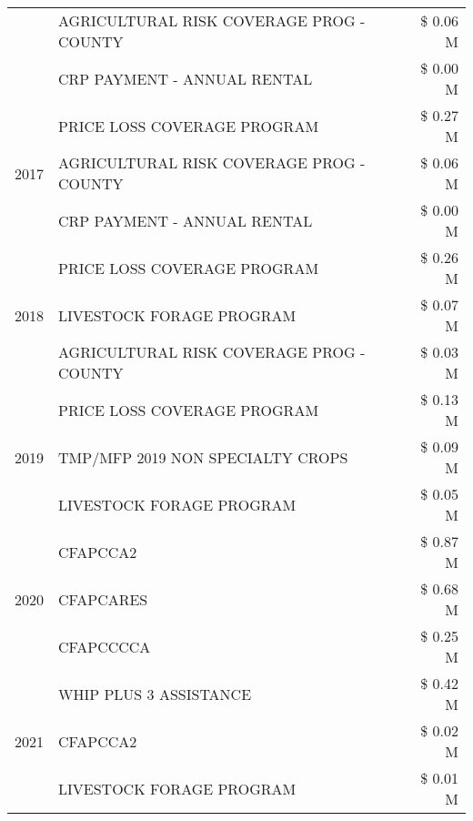 \begin{tabular}{llr}
 & AGRICULTURAL RISK COVERAGE PROG - COUNTY      & \$ 0.06 M \\
 & CRP PAYMENT - ANNUAL RENTAL                   & \$ 0.00 M \\
\cline{1-3}
\multirow[t]{3}{*}{2017} & PRICE LOSS COVERAGE PROGRAM & \$ 0.27 M \\
 & AGRICULTURAL RISK COVERAGE PROG - COUNTY & \$ 0.06 M \\
 & CRP PAYMENT - ANNUAL RENTAL & \$ 0.00 M \\
\cline{1-3}
\multirow[t]{3}{*}{2018} & PRICE LOSS COVERAGE PROGRAM & \$ 0.26 M \\
 & LIVESTOCK FORAGE PROGRAM & \$ 0.07 M \\
 & AGRICULTURAL RISK COVERAGE PROG - COUNTY & \$ 0.03 M \\
\cline{1-3}
\multirow[t]{3}{*}{2019} & PRICE LOSS COVERAGE PROGRAM & \$ 0.13 M \\
 & TMP/MFP 2019 NON SPECIALTY CROPS & \$ 0.09 M \\
 & LIVESTOCK FORAGE PROGRAM & \$ 0.05 M \\
\cline{1-3}
\multirow[t]{3}{*}{2020} & CFAPCCA2 & \$ 0.87 M \\
 & CFAPCARES & \$ 0.68 M \\
 & CFAPCCCCA & \$ 0.25 M \\
\cline{1-3}
\multirow[t]{3}{*}{2021} & WHIP PLUS 3 ASSISTANCE & \$ 0.42 M \\
 & CFAPCCA2 & \$ 0.02 M \\
 & LIVESTOCK FORAGE PROGRAM & \$ 0.01 M \\
\cline{1-3}
\bottomrule
\end{tabular}
